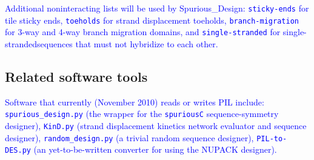 \documentclass{article}
\newcommand{\add}[1]{\textcolor{blue}{#1}}
\begin{document}
\add{Additional noninteracting lists will be used by Spurious_Design:  \texttt{sticky-ends} for tile sticky ends, \texttt{toeholds} for strand displacement toeholds, \texttt{branch-migration} for 3-way and 4-way branch migration domains, and \texttt{single-stranded} for single-strandedsequences that must not hybridize to each other.}



\subsection{Related software tools}

\add{Software that currently (November 2010) reads or writes PIL include: 
  \texttt{spurious_design.py} (the wrapper for the \texttt{spuriousC} sequence-symmetry designer),
  \texttt{KinD.py} (strand displacement kinetics network evaluator and sequence designer),
  \texttt{random_design.py} (a trivial random sequence designer),
  \texttt{PIL-to-DES.py} (an yet-to-be-written converter for using the NUPACK designer).}
\end{document}
